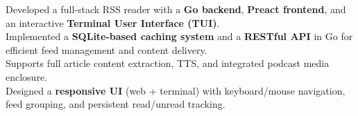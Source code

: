 \documentclass[]{Nikhil_Kadiyan_Resume}
\begin{document}

\pt Developed a full-stack RSS reader with a \textbf{Go backend}, \textbf{Preact frontend}, and an interactive \textbf{Terminal User Interface (TUI)}.\\
\pt Implemented a \textbf{SQLite-based caching system} and a \textbf{RESTful API} in Go for efficient feed management and content delivery.\\
\pt Supports full article content extraction, TTS, and integrated podcast media enclosure.\\
\pt Designed a \textbf{responsive UI} (web + terminal) with keyboard/mouse navigation, feed grouping, and persistent read/unread tracking.\\
\sectionsep

\end{document}
